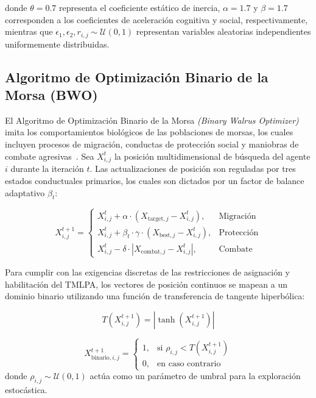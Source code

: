 \documentclass[final,5p,times,twocolumn]{elsarticle}
\begin{document}
donde $\theta = 0.7$ representa el coeficiente estático de inercia, $\alpha = 1.7$ y $\beta = 1.7$ corresponden a los coeficientes de aceleración cognitiva y social, respectivamente, mientras que $\epsilon_1, \epsilon_2, r_{i,j} \sim \mathcal{U}(0, 1)$ representan variables aleatorias independientes uniformemente distribuidas.

\subsection{Algoritmo de Optimización Binario de la Morsa (BWO)}
El Algoritmo de Optimización Binario de la Morsa \textit{(Binary Walrus Optimizer)} imita los comportamientos biológicos de las poblaciones de morsas, los cuales incluyen procesos de migración, conductas de protección social y maniobras de combate agresivas~\cite{han2023walrus}. Sea $X_{i,j}^t$ la posición multidimensional de búsqueda del agente $i$ durante la iteración $t$. Las actualizaciones de posición son reguladas por tres estados conductuales primarios, los cuales son dictados por un factor de balance adaptativo $\beta_t$:

\begin{equation}
X_{i,j}^{t+1} = \begin{cases}
X_{i,j}^t + \alpha \cdot (X_{\text{target},j} - X_{i,j}^t), & \text{Migración} \\
X_{i,j}^t + \beta_t \cdot \gamma \cdot (X_{\text{best},j} - X_{i,j}^t), & \text{Protección} \\
X_{i,j}^t - \delta \cdot |X_{\text{combat},j} - X_{i,j}^t|, & \text{Combate}
\end{cases}
\label{eq:bwo_continuous}
\end{equation}

Para cumplir con las exigencias discretas de las restricciones de asignación y habilitación del TMLPA, los vectores de posición continuos se mapean a un dominio binario utilizando una función de transferencia de tangente hiperbólica:

\begin{equation}
T\left( X_{i,j}^{t+1} \right) = \left| \tanh\left( X_{i,j}^{t+1} \right) \right|
\label{eq:bwo_tanh}
\end{equation}

\begin{equation}
X_{\text{binario}, i,j}^{t+1} = \begin{cases}
1, & \text{si } \rho_{i,j} < T\left( X_{i,j}^{t+1} \right) \\
0, & \text{en caso contrario}
\end{cases}
\label{eq:bwo_binary}
\end{equation}
donde $\rho_{i,j} \sim \mathcal{U}(0, 1)$ actúa como un parámetro de umbral para la exploración estocástica.
\end{document}
